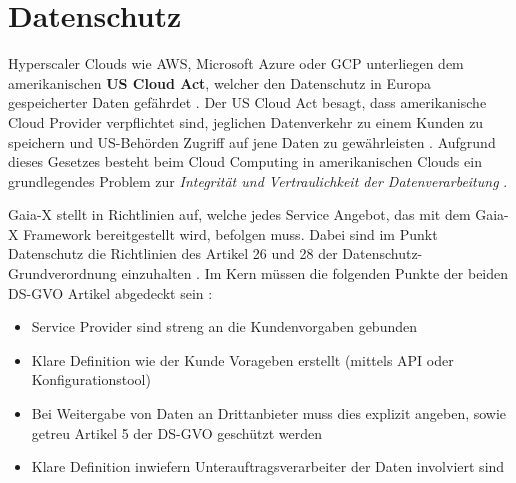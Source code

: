 \chapter{Datenschutz}
\label{chapter:datenschutz}
Hyperscaler Clouds wie \ac{AWS}, Microsoft Azure oder \ac{GCP} unterliegen dem amerikanischen \textbf{US Cloud Act}, welcher
den Datenschutz in Europa gespeicherter Daten gefährdet \cite{Kagermann2021}. Der US Cloud Act besagt,
dass amerikanische Cloud Provider verpflichtet sind, jeglichen Datenverkehr zu einem Kunden zu speichern und 
US-Behörden Zugriff auf jene Daten zu gewährleisten \cite{CloudAct2018}.
Aufgrund dieses Gesetzes besteht beim Cloud Computing in amerikanischen Clouds ein grundlegendes Problem 
zur \emph{Integrität und Vertraulichkeit der Datenverarbeitung} \cite{Weichert2010}.


Gaia-X stellt in \cite{Gaia-XPolicy} Richtlinien auf, welche jedes Service Angebot, das mit dem Gaia-X Framework bereitgestellt wird,
befolgen muss. 
Dabei sind im Punkt Datenschutz die Richtlinien des Artikel 26 und 28 der Datenschutz-Grundverordnung einzuhalten \cite{Gaia-XPolicy}.
Im Kern müssen die folgenden Punkte der beiden DS-GVO Artikel abgedeckt sein \cite{Gaia-XPolicy}:
\begin{itemize}
  \item Service Provider sind streng an die Kundenvorgaben gebunden
  \item Klare Definition wie der Kunde Vorageben erstellt (mittels API oder Konfigurationstool)
  \item Bei Weitergabe von Daten an Drittanbieter muss dies explizit angeben, sowie getreu Artikel 5 der DS-GVO geschützt werden
  \item Klare Definition inwiefern Unterauftragsverarbeiter der Daten involviert sind
\end{itemize}


